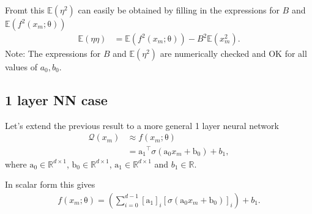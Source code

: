 \documentclass[12pt]{article}
\newcommand{\vect}[1]{\boldsymbol{\mathrm{#1}}}
\newcommand{\note}[1]{{\color{blue} Note: {#1}}}
\newcommand{\expt}[1]{\mathbb{E}\left(#1\right)}
\theoremstyle{remark}
\begin{document}
Fromt this $\expt{\eta^2}$ can easily be obtained by filling in the expressions for $B$ and $\expt{f^2(x_m;\vect{\theta})}$
\begin{align}
	\expt{\eta \eta} &= \expt{f^2(x_m; \vect{\theta})} - B^2\expt{x_m^2}.
\end{align}
\note{The expressions for $B$ and $\expt{\eta^2}$ are numerically checked and OK for all values of $a_0, b_0$.}

\subsection{1 layer NN case}
Let's extend the previous result to a more general 1 layer neural network
\begin{align}
	\mathcal{Q}(x_m) &\approx f(x_m; \vect{\theta})\\
	&= \vect{a_1}^{\intercal}\sigma(\vect{a_0}x_m + \vect{b_0}) + b_1,
\end{align}
where $\vect{a_0} \in \mathbb{R}^{d \times 1}$, $\vect{b_0} \in \mathbb{R}^{d \times 1}$, $\vect{a_1} \in \mathbb{R}^{d \times 1}$ and $b_1 \in \mathbb{R}$.

In scalar form this gives
\begin{align}
	f(x_m; \vect{\theta}) = \left(\sum_{i=0}^{d-1} [\vect{a_1}]_i [\sigma(\vect{a_0}x_m+\vect{b_0})]_i \right)+ b_1.
\end{align}
\end{document}
